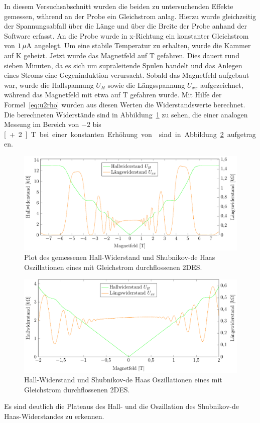 
In diesem Versuchsabschnitt wurden die beiden zu untersuchenden Effekte gemessen, während an der Probe ein Gleichstrom anlag. Hierzu wurde gleichzeitig der Spannungsabfall über die Länge und über die Breite der Probe anhand der Software erfasst. An die Probe wurde in x-Richtung ein konstanter Gleichstrom von $\unit[1]{\mu A}$ angelegt. Um eine stabile Temperatur zu erhalten, wurde die Kammer auf \unit[2]{K} geheizt. Jetzt wurde das Magnetfeld auf \unit[-7,7]{T} gefahren. Dies dauert rund sieben Minuten, da es sich um supraleitende Spulen handelt und das Anlegen eines Stroms eine Gegeninduktion verursacht. Sobald das Magnetfeld aufgebaut war, wurde die Hallspannung $U_H$ sowie die Längsspannung $U_{xx}$ aufgezeichnet, während das Magnetfeld mit etwa  auf \unit[7,7]{T} gefahren wurde. Mit Hilfe der Formel~\eqref{eq:u2rho} wurden aus diesen Werten die Widerstandswerte berechnet.\\

Die berechneten Widerstände sind in Abbildung~\ref{fig:full_range_dc} zu sehen, die einer analogen Messung im Bereich von $-2$ bis \unit[+2]{T} bei einer konstanten Erhöhung von  sind in Abbildung~\ref{fig:2T_range_dc} aufgetragen.

\begin{figure}[h]
	\centering
	\includegraphics{graphs/dc/full_range.pdf}
	\caption[Gleichstrommessung im maximalen Magnetfeldbereich]{
		Plot des gemessenen Hall-Widerstand und Shubnikov-de Haas Oszillationen eines mit Gleichstrom durchflossenen 2DES.
	}
	\label{fig:full_range_dc}
\end{figure}


\begin{figure}[h]
	\centering
	\includegraphics{graphs/dc/pm2T_range.pdf}
	\caption[Höher aufgelöste Gleichstrommessung in Magnetfeldteilbereich]{
		Hall-Widerstand und Shubnikov-de Haas Oszillationen eines mit Gleichstrom durchflossenen 2DES.
	}
	\label{fig:2T_range_dc}
\end{figure}


Es sind deutlich die Plateaus des Hall- und die Oszillation des Shubnikov-de Haas-Widerstandes zu erkennen.